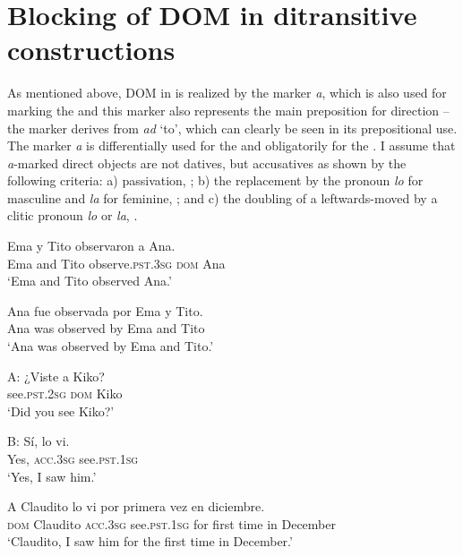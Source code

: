 \documentclass[output=paper]{LSP/langsci}
\begin{document}
\section{Blocking of DOM in ditransitive constructions}
\label{11-he-sec:3}

As mentioned above, DOM in  is realized by the marker \textit{a}, which is also used for marking the  and this marker also represents the main preposition for direction – the marker derives from  \textit{ad} ‘to’, which can clearly be seen in its prepositional use. 
The marker \textit{a} is differentially used for the  and obligatorily for the . I assume that \textit{a}-marked direct objects are not datives, but accusatives as shown by the following criteria: a) passivation, \cf {}; b) the replacement by the pronoun \textit{lo} for masculine and \textit{la} for feminine, \cf {}; and c) the doubling of a leftwards-moved  by a clitic pronoun \textit{lo} or \textit{la}, \cf {} \citep{Campos1999Transitividad}.

\ea %
\label{11-he-ex:26}

\ea \label{11-he-ex:26a}
\gll Ema y Tito observaron a Ana.\\
Ema and Tito observe.\textsc{pst}.\textsc{3sg} \textsc{dom} Ana\\
\glt ‘Ema and Tito observed Ana.’ 

\ex \label{11-he-ex:26b}
\gll Ana fue observada por Ema y Tito.\\
Ana was observed by Ema and Tito\\
\glt ‘Ana was observed by Ema and Tito.’
\z
\z

\ea %
\label{11-he-ex:27}
\ea \label{11-he-ex:27a}
\gll  A: ¿Viste a Kiko?\\
{} see.\textsc{pst}.\textsc{2sg} \textsc{dom} Kiko\\
\glt ‘Did you see Kiko?’ 

\ex \label{11-he-ex:27b}
\gll  B: Sí, lo vi.\\
{} Yes, \textsc{acc}.\textsc{3sg} see.\textsc{pst}.\textsc{1sg}\\
\glt ‘Yes, I saw him.’
\z
\z

\ea %
\label{11-he-ex:28}
\gll A Claudito lo vi por primera vez en diciembre.\\
\textsc{dom} Claudito \textsc{acc}.\textsc{3sg} see.\textsc{pst}.\textsc{1sg} for first time in December\\
\glt ‘Claudito, I saw him for the first time in December.’
\z
\end{document}
